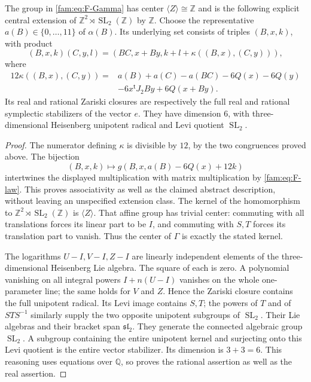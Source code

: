\begin{proposition}\label{fam:src:F.1.2}\label{fam:st:F.1.2}
The group in \eqref{fam:eq:F-Gamma} has center
$\langle Z\rangle\cong\mathbb Z$ and is the following explicit central
extension of $\mathbb Z^2\rtimes\operatorname{SL}_2(\mathbb Z)$ by
$\mathbb Z$.  Choose the representative $a(B)\in\{0,\ldots,11\}$ of
$\alpha(B)$.  Its underlying set consists of triples $(B,x,k)$, with
product
\[
 (B,x,k)(C,y,l)=(BC,x+By,k+l+\kappa((B,x),(C,y))),
\]
where
\begin{align*}
12\kappa((B,x),(C,y))={}&a(B)+a(C)-a(BC)-6Q(x)-6Q(y)\\
 &-6x^{\mathsf t}J_2By+6Q(x+By).
\end{align*}
Its real and rational Zariski closures are respectively the full real
and rational symplectic stabilizers of the vector $e$.  They have
dimension $6$, with three-dimensional Heisenberg unipotent radical and
Levi quotient $\operatorname{SL}_2$.
\end{proposition}

\begin{proof}
The numerator defining $\kappa$ is divisible by $12$, by the two
congruences proved above.  The bijection
\[
 (B,x,k)\longmapsto g(B,x,a(B)-6Q(x)+12k)
\]
intertwines the displayed multiplication with matrix multiplication by
\eqref{fam:eq:F-law}.  This proves associativity as well as the claimed abstract
description, without leaving an unspecified extension class.  The kernel
of the homomorphism to $\mathbb Z^2\rtimes\operatorname{SL}_2(\mathbb Z)$
is $\langle Z\rangle$.  That affine group has trivial center: commuting
with all translations forces its linear part to be $I$, and commuting
with $S,T$ forces its translation part to vanish.  Thus the center of
$\Gamma$ is exactly the stated kernel.

The logarithms $U-I,V-I,Z-I$ are linearly independent elements of the
three-dimensional Heisenberg Lie algebra.  The square of each is zero.
A polynomial vanishing on all integral powers $I+n(U-I)$ vanishes on
the whole one-parameter line; the same holds for $V$ and $Z$.  Hence the
Zariski closure contains the full unipotent radical.  Its Levi image
contains $S,T$; the powers of $T$ and of $STS^{-1}$ similarly supply the
two opposite unipotent subgroups of $\operatorname{SL}_2$.  Their Lie
algebras and their bracket span $\mathfrak{sl}_2$.  They generate the
connected algebraic group $\operatorname{SL}_2$.  A subgroup containing
the entire unipotent kernel and surjecting onto this Levi quotient is
the entire vector stabilizer.  Its dimension is $3+3=6$.  This reasoning
uses equations over $\mathbb Q$, so proves the rational assertion as
well as the real assertion.
\end{proof}

